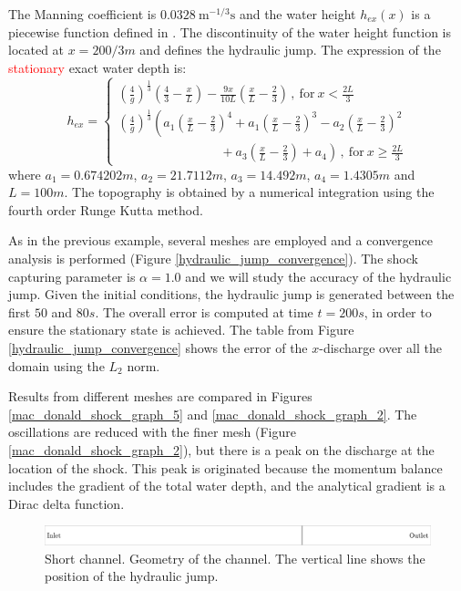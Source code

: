 \documentclass[a4paper,12pt]{elsarticle}
\newcommand{\Miguel}[1]{\textcolor{red}{#1}}
\begin{document}
The Manning coefficient is $0.0328\ \text{m}^{-1/3}\text{s}$ and the water height $h_{ex}(x)$ is a piecewise function defined in \cite{delestre2013}. The discontinuity of the water height function is located at $x=200/3m$ and defines the hydraulic jump. The expression of the \Miguel{stationary} exact water depth is:
\begin{equation} \label{jump_height_definition}
    h_{ex} = \begin{cases}
        \left(\frac{4}{g}\right)^\frac{1}{3} \left(\frac{4}{3} - \frac{x}{L}\right) - \frac{9x}{10L}
            \left(\frac{x}{L} - \frac{2}{3}\right) \, ,\ \text{for} \ x < \frac{2L}{3}\\
        \left(\frac{4}{g}\right)^\frac{1}{3} \left(
              a_1 \left(\frac{x}{L} - \frac{2}{3}\right)^4
            + a_1 \left(\frac{x}{L} - \frac{2}{3}\right)^3
            - a_2 \left(\frac{x}{L} - \frac{2}{3}\right)^2 \right. \\ \left. \qquad\qquad\qquad\qquad
            + a_3 \left(\frac{x}{L} - \frac{2}{3}\right)
            + a_4
        \right) \, ,\ \text{for} \ x \geq \frac{2L}{3}
    \end{cases}
\end{equation}
where $a_1=0.674202m$, $a_2=21.7112m$, $a_3=14.492m$, $a_4=1.4305m$ and $L=100m$. The topography is obtained by a numerical integration using the fourth order Runge Kutta method.

As in the previous example, several meshes are employed and a convergence analysis is performed (Figure \ref{hydraulic_jump_convergence}). The shock capturing parameter is $\alpha=1.0$ and we will study the accuracy of the hydraulic jump. 
Given the initial conditions, the hydraulic jump is generated between the first $50$ and $80s$. The overall error is computed at time $t=200s$, in order to ensure the stationary state is achieved.
The table from Figure \ref{hydraulic_jump_convergence} shows the error of the $x$-discharge over all the domain using the $L_2$ norm.

Results from different meshes are compared in Figures \ref{mac_donald_shock_graph_5} and \ref{mac_donald_shock_graph_2}. The oscillations are reduced with the finer mesh (Figure \ref{mac_donald_shock_graph_2}), but there is a peak on the discharge at the location of the shock. This peak is originated because the momentum balance includes the gradient of the total water depth, and the analytical gradient is a Dirac delta function.

\begin{figure}
    \includegraphics[width=\textwidth]{img/jump/sketch.pdf}
    \caption{Short channel. Geometry of the channel. The vertical line shows the position of the hydraulic jump.}
    \label{chanel_geometry}
\end{figure}
\end{document}
